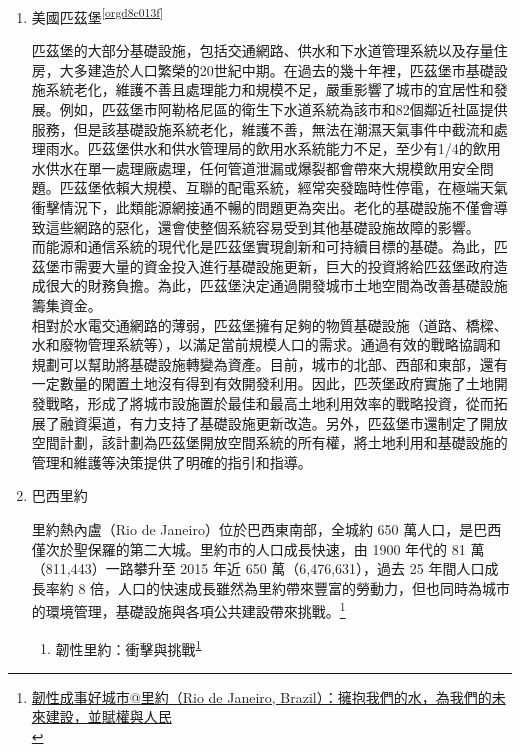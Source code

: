\documentclass[a4paper,12pt]{article}
\begin{document}
\begin{enumerate}
\item 美國匹茲堡\textsuperscript{\ref{orgd8c013f}}
\label{sec:orgcdae6b2}

匹茲堡的大部分基礎設施，包括交通網路、供水和下水道管理系統以及存量住房，大多建造於人口繁榮的20世紀中期。在過去的幾十年裡，匹茲堡市基礎設施系統老化，維護不善且處理能力和規模不足，嚴重影響了城市的宜居性和發展。例如，匹茲堡市阿勒格尼區的衛生下水道系統為該市和82個鄰近社區提供服務，但是該基礎設施系統老化，維護不善，無法在潮濕天氣事件中截流和處理雨水。匹茲堡供水和供水管理局的飲用水系統能力不足，至少有1/4的飲用水供水在單一處理廠處理，任何管道泄漏或爆裂都會帶來大規模飲用安全問題。匹茲堡依賴大規模、互聯的配電系統，經常突發臨時性停電，在極端天氣衝擊情況下，此類能源網接通不暢的問題更為突出。老化的基礎設施不僅會導致這些網路的惡化，還會使整個系統容易受到其他基礎設施故障的影響。\\

而能源和通信系統的現代化是匹茲堡實現創新和可持續目標的基礎。為此，匹茲堡市需要大量的資金投入進行基礎設施更新，巨大的投資將給匹茲堡政府造成很大的財務負擔。為此，匹茲堡決定通過開發城市土地空間為改善基礎設施籌集資金。\\

相對於水電交通網路的薄弱，匹茲堡擁有足夠的物質基礎設施（道路、橋樑、水和廢物管理系統等），以滿足當前規模人口的需求。通過有效的戰略協調和規劃可以幫助將基礎設施轉變為資產。目前，城市的北部、西部和東部，還有一定數量的閑置土地沒有得到有效開發利用。因此，匹茨堡政府實施了土地開發戰略，形成了將城市設施置於最佳和最高土地利用效率的戰略投資，從而拓展了融資渠道，有力支持了基礎設施更新改造。另外，匹茲堡市還制定了開放空間計劃，該計劃為匹茲堡開放空間系統的所有權，將土地利用和基礎設施的管理和維護等決策提供了明確的指引和指導。\\

\item 巴西里約
\label{sec:org2a18f6f}

里約熱內盧（Rio de Janeiro）位於巴西東南部，全城約 650 萬人口，是巴西僅次於聖保羅的第二大城。里約市的人口成長快速，由 1900 年代的 81 萬（811,443）一路攀升至 2015 年近 650 萬（6,476,631），過去 25 年間人口成長率約 8 倍，人口的快速成長雖然為里約帶來豐富的勞動力，但也同時為城市的環境管理，基礎設施與各項公共建設帶來挑戰。\footnote{\href{https://eyesonplace.net/2018/12/12/9554/}{韌性成事好城市@里約（Rio de Janeiro, Brazil）：擁抱我們的水，為我們的未來建設，並賦權與人民}\\\label{org45919cb}}\\

\begin{enumerate}
\item 韌性里約：衝擊與挑戰\textsuperscript{\ref{org45919cb}}
\label{sec:org8fc99b5}


\end{enumerate}
\end{enumerate}
\end{document}
